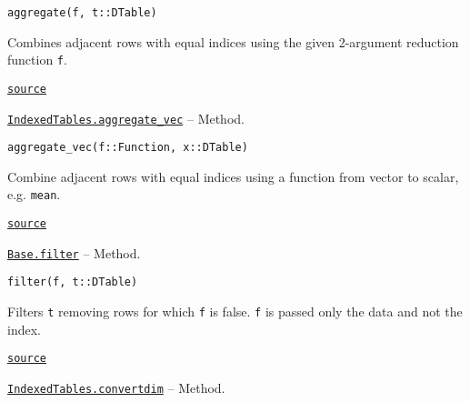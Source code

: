 \documentclass{memoir}
\begin{document}
\begin{adjustwidth}{2em}{0pt}


\begin{lstlisting}
aggregate(f, t::DTable)
\end{lstlisting}

Combines adjacent rows with equal indices using the given 2-argument reduction function \texttt{f}.



\href{https://github.com/JuliaComputing/JuliaDB.jl/tree/9e65f8c3b0e9c2e27c3334a093a5aefc6c7d1246/src/query.jl#L50-L55}{\texttt{source}}


\end{adjustwidth}
\hypertarget{18013083123490576972}{} 
\hyperlink{18013083123490576972}{\texttt{IndexedTables.aggregate\_vec}}  -- {Method.}

\begin{adjustwidth}{2em}{0pt}


\begin{lstlisting}
aggregate_vec(f::Function, x::DTable)
\end{lstlisting}

Combine adjacent rows with equal indices using a function from vector to scalar, e.g. \texttt{mean}.



\href{https://github.com/JuliaComputing/JuliaDB.jl/tree/9e65f8c3b0e9c2e27c3334a093a5aefc6c7d1246/src/query.jl#L64-L69}{\texttt{source}}


\end{adjustwidth}
\hypertarget{18191308245886912132}{} 
\hyperlink{18191308245886912132}{\texttt{Base.filter}}  -- {Method.}

\begin{adjustwidth}{2em}{0pt}


\begin{lstlisting}
filter(f, t::DTable)
\end{lstlisting}

Filters \texttt{t} removing rows for which \texttt{f} is false. \texttt{f} is passed only the data and not the index.



\href{https://github.com/JuliaComputing/JuliaDB.jl/tree/9e65f8c3b0e9c2e27c3334a093a5aefc6c7d1246/src/query.jl#L78-L83}{\texttt{source}}


\end{adjustwidth}
\hypertarget{962396936399075086}{} 
\hyperlink{962396936399075086}{\texttt{IndexedTables.convertdim}}  -- {Method.}
\end{document}
